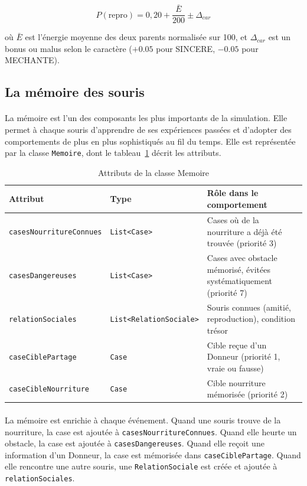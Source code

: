 \begin{equation}
P(\text{repro}) = 0{,}20 + \frac{\bar{E}}{200} \pm \Delta_{car}
\label{eq:repro}
\end{equation}

où $\bar{E}$ est l'énergie moyenne des deux parents normalisée sur 100, et $\Delta_{car}$ est un bonus ou malus selon le caractère ($+0.05$ pour SINCERE, $-0.05$ pour MECHANTE).

\bigskip

\subsection{La mémoire des souris}

\paragraph{} La mémoire est l'un des composants les plus importants de la simulation. Elle permet à chaque souris d'apprendre de ses expériences passées et d'adopter des comportements de plus en plus sophistiqués au fil du temps. Elle est représentée par la classe \texttt{Memoire}, dont le tableau~\ref{tab:memoire} décrit les attributs.

\begin{table}[h!]
\centering
\renewcommand{\arraystretch}{1.5}
\begin{tabular}{|l|l|p{6cm}|}
\hline
\textbf{Attribut} & \textbf{Type} & \textbf{Rôle dans le comportement} \\
\hline
\texttt{casesNourritureConnues} & \texttt{List<Case>} & Cases où de la nourriture a déjà été trouvée (priorité 3) \\
\hline
\texttt{casesDangereuses} & \texttt{List<Case>} & Cases avec obstacle mémorisé, évitées systématiquement (priorité 7) \\
\hline
\texttt{relationSociales} & \texttt{List<RelationSociale>} & Souris connues (amitié, reproduction), condition trésor \\
\hline
\texttt{caseCiblePartage} & \texttt{Case} & Cible reçue d'un Donneur (priorité 1, vraie ou fausse) \\
\hline
\texttt{caseCibleNourriture} & \texttt{Case} & Cible nourriture mémorisée (priorité 2) \\
\hline
\end{tabular}
\caption{Attributs de la classe Memoire}
\label{tab:memoire}
\end{table}

\paragraph{} La mémoire est enrichie à chaque événement. Quand une souris trouve de la nourriture, la case est ajoutée à \texttt{casesNourritureConnues}. Quand elle heurte un obstacle, la case est ajoutée à \texttt{casesDangereuses}. Quand elle reçoit une information d'un Donneur, la case est mémorisée dans \texttt{caseCiblePartage}. Quand elle rencontre une autre souris, une \texttt{RelationSociale} est créée et ajoutée à \texttt{relationSociales}.

